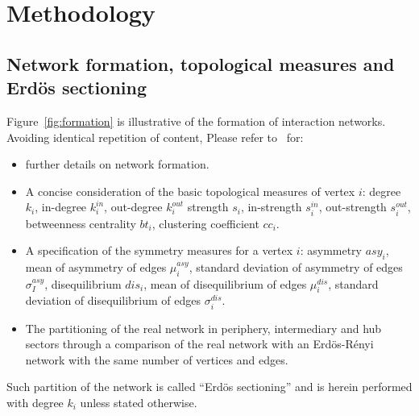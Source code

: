 \documentclass[%
 aip,
 jmp,%
 amsmath,amssymb,
 reprint,%
]{revtex4-1}
\begin{document}
\section{Methodology}\label{sec:methods}


\subsection{Network formation, topological measures and Erd\"os sectioning}\label{subsec:net}


Figure~\ref{fig:formation} is illustrative of the formation of interaction networks.
Avoiding identical repetition of content,
Please refer to~\cite{evoSN} for:
\begin{itemize}
	\item further details on network formation.
	\item A concise consideration of the basic topological measures of vertex $i$: degree $k_i$, in-degree $k_i^{in}$, out-degree $k_i^{out}$ strength $s_i$, in-strength $s_i^{in}$, out-strength $s_i^{out}$, betweenness centrality $bt_i$, clustering coefficient $cc_i$.
	\item A specification of the symmetry measures for a vertex $i$:
		asymmetry $asy_i$, mean of asymmetry of edges $\mu_i^{asy}$, standard deviation of asymmetry of edges $\sigma_I^{asy}$, disequilibrium $dis_i$, mean of disequilibrium of edges $\mu_i^{dis}$, standard deviation of disequilibrium of edges $\sigma_i^{dis}$.
	\item The partitioning of the real network in periphery, intermediary and hub sectors through a comparison of the real network with an Erd\"os-R\'enyi network with the same number of vertices and edges. 
\end{itemize}
Such partition of the network is called ``Erd\"os sectioning'' and is
herein performed with degree $k_i$ unless stated otherwise.
\end{document}
